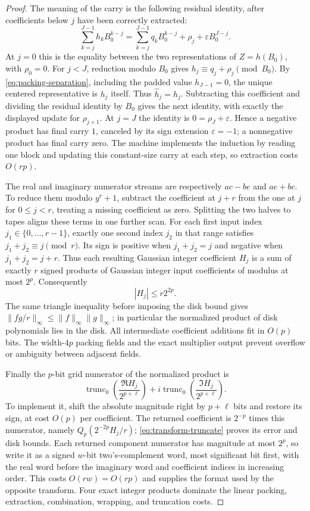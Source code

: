 \documentclass[11pt]{article}
\theoremstyle{definition}
\begin{document}
\begin{proof}
The meaning of the carry is the following residual identity, after
coefficients below $j$ have been correctly extracted:
\[
 \sum_{k=j}^{J-1}h_kB_0^{k-j}
 =\sum_{k=j}^{J-1}q_kB_0^{k-j}
       +\rho_j+\varepsilon B_0^{J-j}.
\]
At $j=0$ this is the equality between the two representations of
$Z=h(B_0)$, with
$\rho_0=0$.  For $j<J$, reduction modulo $B_0$ gives
$h_j\equiv q_j+\rho_j\pmod{B_0}$.  By
\eqref{eq:packing-separation}, including the padded value
$h_{J-1}=0$, the unique centered representative is $h_j$ itself.
Thus $\widehat h_j=h_j$.  Subtracting this coefficient and dividing
the residual identity by $B_0$ gives the next identity, with exactly
the displayed update for $\rho_{j+1}$.  At $j=J$ the identity is
$0=\rho_J+\varepsilon$.  Hence a negative product has final carry
$1$, canceled by its sign extension $\varepsilon=-1$; a nonnegative
product has final carry zero.  The machine implements the induction
by reading one block and updating this constant-size carry at each
step, so extraction costs $O(rp)$.

The real and imaginary numerator streams are respectively
$ac-be$ and $ae+bc$.  To reduce them modulo $y^r+1$, subtract the
coefficient at $j+r$ from the one at $j$ for $0\leq j<r$, treating
a missing coefficient as zero.  Splitting the two halves to tapes
aligns these terms in one further scan.  For each first input index
$j_1\in\{0,\ldots,r-1\}$, exactly one second index $j_2$ in that
range satisfies $j_1+j_2\equiv j\pmod r$.  Its sign is positive
when $j_1+j_2=j$ and negative when $j_1+j_2=j+r$.  Thus each
resulting Gaussian integer coefficient $H_j$ is a sum of exactly
$r$ signed products of Gaussian integer input coefficients of
modulus at most $2^p$.  Consequently
\[
       |H_j|\leq r2^{2p}.
\]
The same triangle inequality before imposing the disk bound gives
$\|fg/r\|_\infty\leq\|f\|_\infty\|g\|_\infty$; in particular the
normalized product of disk polynomials lies in the disk.  All
intermediate coefficient additions fit in $O(p)$ bits.  The
width-$4p$ packing fields and the exact multiplier output prevent
overflow or ambiguity between adjacent fields.

Finally the $p$-bit grid numerator of the normalized product is
\[
 \operatorname{trunc}_0\left(\frac{\Re H_j}{2^{p+\ell}}\right)
   +i\operatorname{trunc}_0\left(\frac{\Im H_j}{2^{p+\ell}}\right).
\]
To implement it, shift the absolute magnitude right by $p+\ell$
bits and restore its sign, at cost $O(p)$ per coefficient.  The returned
coefficient is $2^{-p}$ times this numerator, namely
$Q_p(2^{-2p}H_j/r)$; \eqref{eq:transform-truncate} proves its error
and disk bounds. Each returned component numerator has magnitude at
most $2^p$, so write it as a signed $w$-bit two's-complement word,
most significant bit first, with the real word before the imaginary
word and coefficient indices in increasing order. This costs
$O(rw)=O(rp)$ and supplies the format used by the opposite transform.
Four exact integer products dominate the linear
packing, extraction, combination, wrapping, and truncation costs.
\end{proof}
\end{document}
